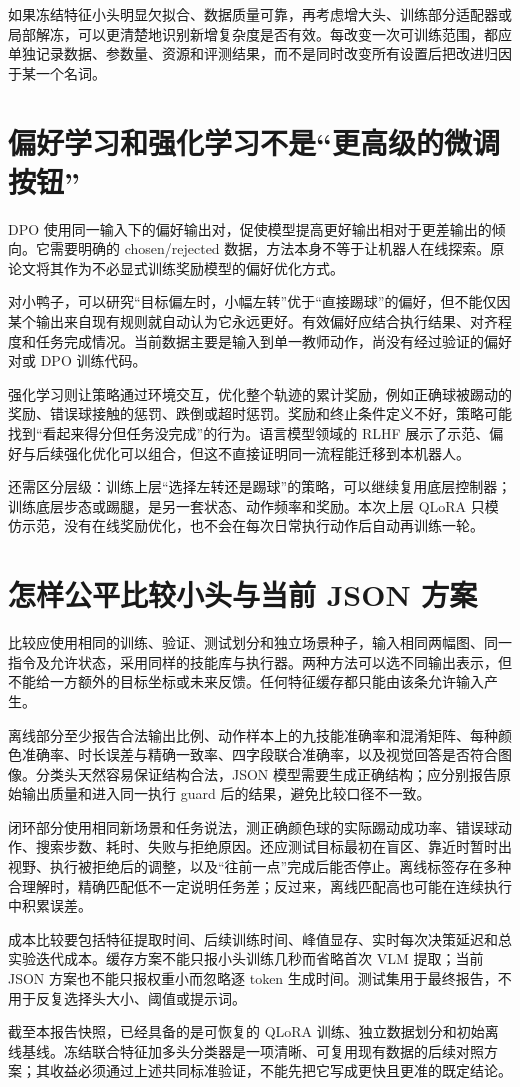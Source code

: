 如果冻结特征小头明显欠拟合、数据质量可靠，再考虑增大头、训练部分适配器或局部解冻，可以更清楚地识别新增复杂度是否有效。每改变一次可训练范围，都应单独记录数据、参数量、资源和评测结果，而不是同时改变所有设置后把改进归因于某一个名词。

\section{偏好学习和强化学习不是“更高级的微调按钮”}

DPO 使用同一输入下的偏好输出对，促使模型提高更好输出相对于更差输出的倾向。它需要明确的 chosen/rejected 数据，方法本身不等于让机器人在线探索。原论文将其作为不必显式训练奖励模型的偏好优化方式。\cite{dpo-paper}

对小鸭子，可以研究“目标偏左时，小幅左转”优于“直接踢球”的偏好，但不能仅因某个输出来自现有规则就自动认为它永远更好。有效偏好应结合执行结果、对齐程度和任务完成情况。当前数据主要是输入到单一教师动作，尚没有经过验证的偏好对或 DPO 训练代码。

强化学习则让策略通过环境交互，优化整个轨迹的累计奖励，例如正确球被踢动的奖励、错误球接触的惩罚、跌倒或超时惩罚。奖励和终止条件定义不好，策略可能找到“看起来得分但任务没完成”的行为。语言模型领域的 RLHF 展示了示范、偏好与后续强化优化可以组合，但这不直接证明同一流程能迁移到本机器人。\cite{instructgpt-paper}

还需区分层级：训练上层“选择左转还是踢球”的策略，可以继续复用底层控制器；训练底层步态或踢腿，是另一套状态、动作频率和奖励。本次上层 QLoRA 只模仿示范，没有在线奖励优化，也不会在每次日常执行动作后自动再训练一轮。

\section{怎样公平比较小头与当前 JSON 方案}

比较应使用相同的训练、验证、测试划分和独立场景种子，输入相同两幅图、同一指令及允许状态，采用同样的技能库与执行器。两种方法可以选不同输出表示，但不能给一方额外的目标坐标或未来反馈。任何特征缓存都只能由该条允许输入产生。

离线部分至少报告合法输出比例、动作样本上的九技能准确率和混淆矩阵、每种颜色准确率、时长误差与精确一致率、四字段联合准确率，以及视觉回答是否符合图像。分类头天然容易保证结构合法，JSON 模型需要生成正确结构；应分别报告原始输出质量和进入同一执行 guard 后的结果，避免比较口径不一致。

闭环部分使用相同新场景和任务说法，测正确颜色球的实际踢动成功率、错误球动作、搜索步数、耗时、失败与拒绝原因。还应测试目标最初在盲区、靠近时暂时出视野、执行被拒绝后的调整，以及“往前一点”完成后能否停止。离线标签存在多种合理解时，精确匹配低不一定说明任务差；反过来，离线匹配高也可能在连续执行中积累误差。

成本比较要包括特征提取时间、后续训练时间、峰值显存、实时每次决策延迟和总实验迭代成本。缓存方案不能只报小头训练几秒而省略首次 VLM 提取；当前 JSON 方案也不能只报权重小而忽略逐 token 生成时间。测试集用于最终报告，不用于反复选择头大小、阈值或提示词。

截至本报告快照，已经具备的是可恢复的 QLoRA 训练、独立数据划分和初始离线基线。冻结联合特征加多头分类器是一项清晰、可复用现有数据的后续对照方案；其收益必须通过上述共同标准验证，不能先把它写成更快且更准的既定结论。
